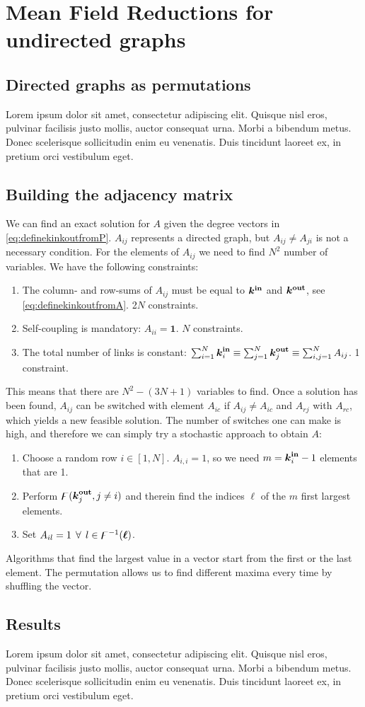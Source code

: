 \newpage
\section{\mywork Mean Field Reductions for undirected graphs}
\subsection{Directed graphs as permutations}
Lorem ipsum dolor sit amet, consectetur adipiscing elit. Quisque nisl eros, 
pulvinar facilisis justo mollis, auctor consequat urna. Morbi a bibendum metus. 
Donec scelerisque sollicitudin enim eu venenatis. Duis tincidunt laoreet ex, 
in pretium orci vestibulum eget.

\subsection{Building the adjacency matrix} \label{sec:buildingA}
We can find an exact solution for $A$ given the degree vectors in \eqref{eq:definekinkoutfromP}. $A_{ij}$ represents a directed graph, but $A_{ij} \neq A_{ji}$ is not a necessary condition. For the elements of $A_{ij}$ we need to find $N^2$ number of variables. We have the following constraints:
\begin{enumerate}
\item The column- and row-sums of $A_{ij}$ must be equal to ${\boldsymbol{k^{\rm in}}}$ and $\boldsymbol{{k^{\rm out}}}$, see \eqref{eq:definekinkoutfromA}. 2$N$ constraints.
\item Self-coupling is mandatory: $A_{ii} = \boldsymbol{1}$. $N$ constraints.
\item The total number of links is constant: $\sum_{i=1}^{N} {\boldsymbol{k}_i^{\bf in}} \equiv \sum_{j=1}^{N} {\boldsymbol{k}_j^{\bf out}} \equiv \sum_{i,j=1}^{N}A_{i j}$. 1 constraint.
\end{enumerate}
This means that there are $N^2 - (3N + 1)$ variables to find. Once a solution has been found, $A_{ij}$ can be switched with element $A_{ic}$ if $A_{ij} \neq A_{ic}$ and $A_{rj}$ with $A_{rc}$, which yields a new feasible solution. The number of switches one can make is high, and therefore we can simply try a stochastic approach to obtain $A$:
\begin{enumerate}
\item Choose a random row $i \in [1,N]$. $A_{i,i} = 1$, so we need $m = {\boldsymbol{k}_i^{\bf in}} - 1$ elements that are 1.
\item Perform ${\digamma} ( {\boldsymbol{k}_j^{\bf out}}, j \neq i)$ and therein find the indices $\boldsymbol{\ell}$ of the $m$ first largest elements. 
\item Set $A_{il} = 1 \: \: \forall \: \: l \in {\digamma^{-1}} (\boldsymbol{\ell})$.
\end{enumerate}
Algorithms that find the largest value in a vector start from the first or the last element. The permutation allows us to find different maxima every time by shuffling the vector.

\subsection{Results}
Lorem ipsum dolor sit amet, consectetur adipiscing elit. Quisque nisl eros, 
pulvinar facilisis justo mollis, auctor consequat urna. Morbi a bibendum metus. 
Donec scelerisque sollicitudin enim eu venenatis. Duis tincidunt laoreet ex, 
in pretium orci vestibulum eget.
